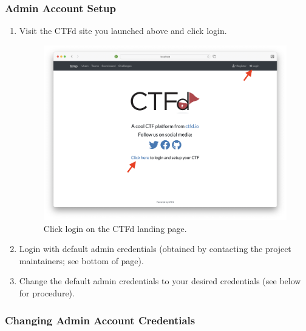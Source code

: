 \documentclass[11pt]{article}
\begin{document}
\subsubsection{Admin Account Setup}

\begin{enumerate}
	\item Visit the CTFd site you launched above and click login.
   \begin{figure}[H]
		\centering
	   \includegraphics[width=\textwidth]{ctfd_landing_page.png}
  	   \caption{Click login on the CTFd landing page.}
	\end{figure}
	\item Login with default admin credentials (obtained by contacting the project maintainers; see bottom of page).
	\item Change the default admin credentials to your desired credentials (see below for procedure).
\end{enumerate}

\subsubsection{Changing Admin Account Credentials}
\end{document}
